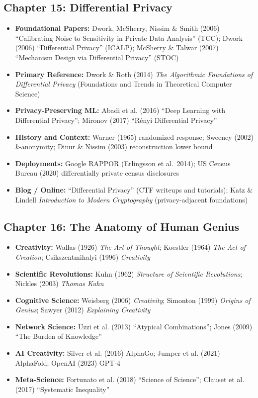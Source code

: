 \subsection{Chapter 15: Differential Privacy}
\begin{itemize}
\item \textbf{Foundational Papers:} Dwork, McSherry, Nissim \& Smith (2006) ``Calibrating Noise to Sensitivity in Private Data Analysis'' (TCC); Dwork (2006) ``Differential Privacy'' (ICALP); McSherry \& Talwar (2007) ``Mechanism Design via Differential Privacy'' (STOC)
\item \textbf{Primary Reference:} Dwork \& Roth (2014) \emph{The Algorithmic Foundations of Differential Privacy} (Foundations and Trends in Theoretical Computer Science)
\item \textbf{Privacy-Preserving ML:} Abadi et al. (2016) ``Deep Learning with Differential Privacy''; Mironov (2017) ``R\'enyi Differential Privacy''
\item \textbf{History and Context:} Warner (1965) randomized response; Sweeney (2002) $k$-anonymity; Dinur \& Nissim (2003) reconstruction lower bound
\item \textbf{Deployments:} Google RAPPOR (Erlingsson et al.\ 2014); US Census Bureau (2020) differentially private census disclosures
\item \textbf{Blog / Online:} ``Differential Privacy'' (CTF writeups and tutorials); Katz \& Lindell \emph{Introduction to Modern Cryptography} (privacy-adjacent foundations)
\end{itemize}

\subsection{Chapter 16: The Anatomy of Human Genius}
\begin{itemize}
\item \textbf{Creativity:} Wallas (1926) \emph{The Art of Thought}; Koestler (1964) \emph{The Act of Creation}; Csikszentmihalyi (1996) \emph{Creativity}
\item \textbf{Scientific Revolutions:} Kuhn (1962) \emph{Structure of Scientific Revolutions}; Nickles (2003) \emph{Thomas Kuhn}
\item \textbf{Cognitive Science:} Weisberg (2006) \emph{Creativity}; Simonton (1999) \emph{Origins of Genius}; Sawyer (2012) \emph{Explaining Creativity}
\item \textbf{Network Science:} Uzzi et al. (2013) ``Atypical Combinations''; Jones (2009) ``The Burden of Knowledge''
\item \textbf{AI Creativity:} Silver et al. (2016) AlphaGo; Jumper et al. (2021) AlphaFold; OpenAI (2023) GPT-4
\item \textbf{Meta-Science:} Fortunato et al. (2018) ``Science of Science''; Clauset et al. (2017) ``Systematic Inequality''
\end{itemize}

